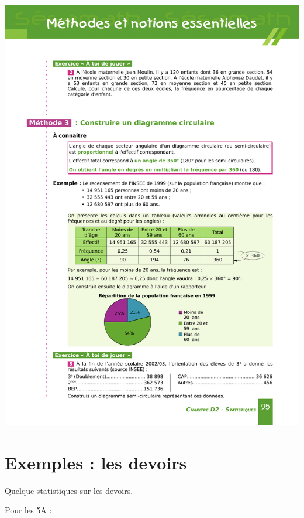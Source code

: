 \begin{center}
\includegraphics{sesamath5p95.pdf}
\end{center}


\section{Exemples : les devoirs}

Quelque statistiques sur les devoirs.

\vfill

Pour les 5A :


